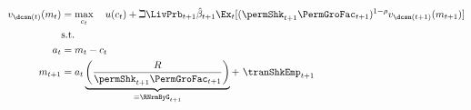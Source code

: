   \begin{equation*}\begin{gathered}\begin{aligned}
        v_{\dcsn(t)}(m_{t})  & = \max_{{c}_{t}}~~~ u(c_{t})+\beth\LivPrb_{t+1}\hat{\beta}_{t+1}
        \Ex_{t}[(\permShk_{t+1}\PermGroFac_{t+1})^{1-\rho}v_{\dcsn(t+1)}(m_{t+1})]   \\
        & \text{s.t.}   \nonumber \\
        a_{t}    & = m_{t}-c_{t} \nonumber
        \\      m_{t+1}  & = a_{t}\underbrace{\left(\frac{R}{\permShk_{t+1}\PermGroFac_{t+1}}\right)}_{\equiv \RNrmByG_{t+1}}+ ~\tranShkEmp_{t+1}
      \end{aligned}\end{gathered}\end{equation*}
